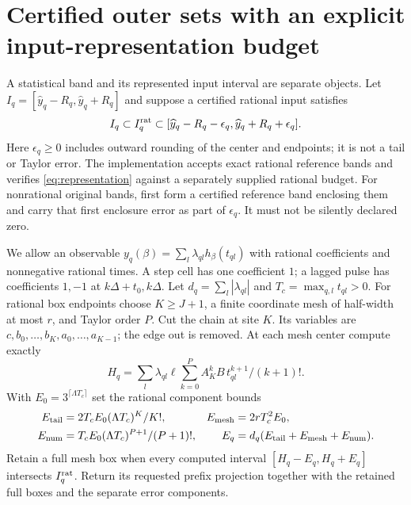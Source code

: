 \section{Certified outer sets with an explicit input-representation budget}
\label{sec:enclosures}
A statistical band and its represented input interval are separate objects.
Let $I_q=[\widehat y_q-R_q,\widehat y_q+R_q]$ and suppose a certified rational
input satisfies
\begin{equation}
 I_q\subset I_q^{\rm rat}\subset
 [\widehat y_q-R_q-\epsilon_q,\widehat y_q+R_q+\epsilon_q].
 \label{eq:representation}
\end{equation}
Here $\epsilon_q\ge0$ includes outward rounding of the center and endpoints;
it is not a tail or Taylor error. The implementation accepts exact rational
reference bands and verifies \eqref{eq:representation} against a separately
supplied rational budget. For nonrational original bands, first form a certified
reference band enclosing them and carry that first enclosure error as part of
$\epsilon_q$. It must not be silently declared zero.

We allow an observable
$y_q(\beta)=\sum_l\lambda_{ql}h_\beta(t_{ql})$ with rational coefficients and
nonnegative rational times. A step cell has one coefficient $1$; a lagged pulse
has coefficients $1,-1$ at $k\Delta+t_0,k\Delta$. Let
$d_q=\sum_l|\lambda_{ql}|$ and $T_c=\max_{q,l}t_{ql}>0$.
For rational box endpoints choose $K\ge J+1$, a finite coordinate mesh of
half-width at most $r$, and Taylor order $P$. Cut the chain at site $K$.
Its variables are $c,b_0,\ldots,b_K,a_0,\ldots,a_{K-1}$; the edge out is removed.
At each mesh center compute exactly
\[
 H_q=\sum_l\lambda_{ql}\ell\sum_{k=0}^P A_K^kB\,
                         t_{ql}^{k+1}/(k+1)!.
\]
With $E_0=3^{\lceil\Lambda T_c\rceil}$ set the rational component bounds
\begin{equation}
 \begin{aligned}
 E_{\rm tail}&=2T_cE_0(\Lambda T_c)^K/K!,&
 E_{\rm mesh}&=2rT_c^2E_0,\\
 E_{\rm num}&=T_cE_0(\Lambda T_c)^{P+1}/(P+1)!,&
 E_q&=d_q(E_{\rm tail}+E_{\rm mesh}+E_{\rm num}).
 \end{aligned}
 \label{eq:outer-errors}
\end{equation}
Retain a full mesh box when every computed interval $[H_q-E_q,H_q+E_q]$
intersects $I_q^{\rm rat}$. Return its requested prefix projection together
with the retained full boxes and the separate error components.

